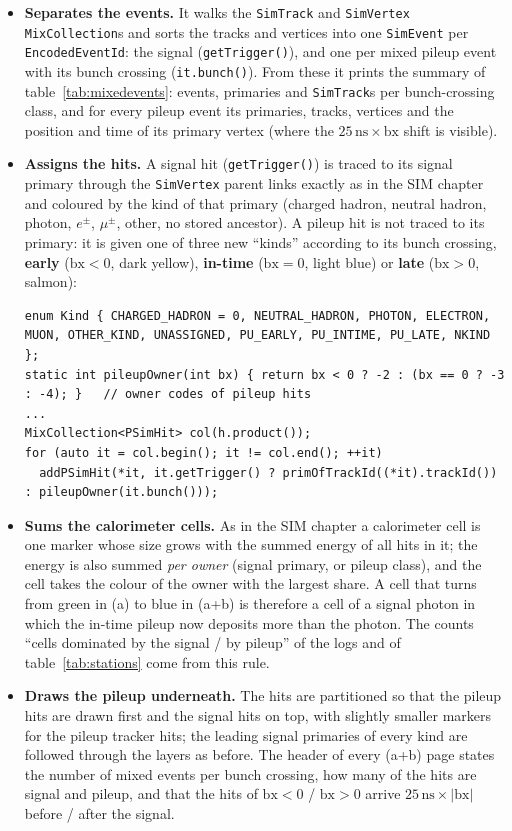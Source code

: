 \documentclass[11pt,a4paper]{article}
\newcommand{\code}[1]{\texttt{#1}}
\newcommand{\bx}{\ensuremath{\mathrm{bx}}}
\newcommand{\ns}{\,\mathrm{ns}}
\begin{document}
\begin{itemize}
\item \textbf{Separates the events.} It walks the \code{SimTrack} and \code{SimVertex}
  \code{MixCollection}s and sorts the tracks and vertices into one \code{SimEvent} per
  \code{EncodedEventId}: the signal (\code{getTrigger()}), and one per mixed pileup event with its bunch
  crossing (\code{it.bunch()}). From these it prints the summary of table~\ref{tab:mixedevents}: events,
  primaries and \code{SimTrack}s per bunch-crossing class, and for every pileup event its primaries, tracks,
  vertices and the position and time of its primary vertex (where the $25\ns\times\bx$ shift is visible).
\item \textbf{Assigns the hits.} A signal hit (\code{getTrigger()}) is traced to its signal primary through
  the \code{SimVertex} parent links exactly as in the SIM chapter and coloured by the kind of that primary
  (charged hadron, neutral hadron, photon, $e^\pm$, $\mu^\pm$, other, no stored ancestor). A pileup hit is
  not traced to its primary: it is given one of three new ``kinds'' according to its bunch crossing,
  \textcolor{puearly}{\textbf{early}} ($\bx<0$, dark yellow), \textcolor{puintime}{\textbf{in-time}}
  ($\bx=0$, light blue) or \textcolor{pulate}{\textbf{late}} ($\bx>0$, salmon):
\begin{lstlisting}[style=cpp]
enum Kind { CHARGED_HADRON = 0, NEUTRAL_HADRON, PHOTON, ELECTRON, MUON, OTHER_KIND, UNASSIGNED, PU_EARLY, PU_INTIME, PU_LATE, NKIND };
static int pileupOwner(int bx) { return bx < 0 ? -2 : (bx == 0 ? -3 : -4); }   // owner codes of pileup hits
...
MixCollection<PSimHit> col(h.product());
for (auto it = col.begin(); it != col.end(); ++it)
  addPSimHit(*it, it.getTrigger() ? primOfTrackId((*it).trackId()) : pileupOwner(it.bunch()));
\end{lstlisting}
\item \textbf{Sums the calorimeter cells.} As in the SIM chapter a calorimeter cell is one marker whose
  size grows with the summed energy of all hits in it; the energy is also summed \emph{per owner} (signal
  primary, or pileup class), and the cell takes the colour of the owner with the largest share. A cell that
  turns from green in (a) to blue in (a+b) is therefore a cell of a signal photon in which the in-time
  pileup now deposits more than the photon. The counts ``cells dominated by the signal / by pileup'' of the
  logs and of table~\ref{tab:stations} come from this rule.
\item \textbf{Draws the pileup underneath.} The hits are partitioned so that the pileup hits are drawn
  first and the signal hits on top, with slightly smaller markers for the pileup tracker hits; the leading
  signal primaries of every kind are followed through the layers as before. The header of every (a+b) page
  states the number of mixed events per bunch crossing, how many of the hits are signal and pileup, and that
  the hits of $\bx<0$ / $\bx>0$ arrive $25\ns\times|\bx|$ before / after the signal.
\end{itemize}
\end{document}
